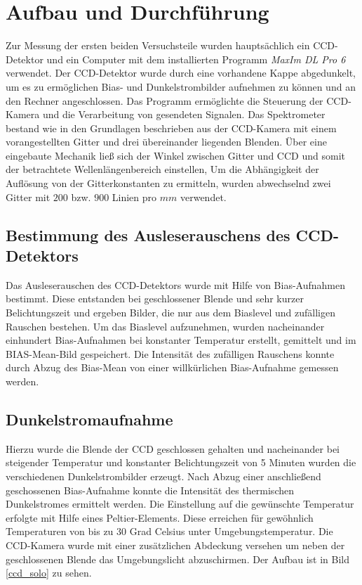 \section{Aufbau und Durchführung} %
\label{sec:aufbau_und_durchf_hrung}

	Zur Messung der ersten beiden Versuchsteile wurden hauptsächlich ein CCD-Detektor und ein Computer mit dem installierten Programm \textit{MaxIm DL Pro 6} verwendet.
	Der CCD-Detektor wurde durch eine vorhandene Kappe abgedunkelt, um es zu ermöglichen Bias- und Dunkelstrombilder aufnehmen zu können und an den Rechner angeschlossen.
	Das Programm ermöglichte die Steuerung der CCD-Kamera und die Verarbeitung von gesendeten Signalen.
	Das Spektrometer bestand wie in den Grundlagen beschrieben aus der CCD-Kamera mit einem vorangestellten Gitter und drei übereinander liegenden Blenden.
	Über eine eingebaute Mechanik ließ sich der Winkel zwischen Gitter und CCD und somit der betrachtete Wellenlängenbereich einstellen,
	Um die Abhängigkeit der Auflösung von der Gitterkonstanten zu ermitteln, wurden abwechselnd zwei Gitter mit $200$ bzw. $900$ Linien pro $\unit{mm}$ verwendet.

	\subsection{Bestimmung des Ausleserauschens des CCD-Detektors} %
	\label{sub:bestimmung_des_ausleserauschens_des_ccd_detektors}
	
		Das Ausleserauschen des CCD-Detektors wurde mit Hilfe von Bias-Aufnahmen bestimmt.
		Diese entstanden bei geschlossener Blende und sehr kurzer Belichtungszeit und ergeben Bilder, die nur aus dem Biaslevel und zufälligen Rauschen bestehen.
		Um das Biaslevel aufzunehmen, wurden nacheinander einhundert Bias-Aufnahmen bei konstanter Temperatur erstellt, gemittelt und im BIAS-Mean-Bild gespeichert. 
		Die Intensität des zufälligen Rauschens konnte durch Abzug des Bias-Mean von einer willkürlichen Bias-Aufnahme gemessen werden.



	\subsection{Dunkelstromaufnahme} %
	\label{sub:dunkelstromaufnahme}

		Hierzu wurde die Blende der CCD geschlossen gehalten und nacheinander bei steigender Temperatur und konstanter Belichtungszeit von 5 Minuten wurden die verschiedenen Dunkelstrombilder erzeugt. 
		Nach Abzug einer anschließend geschossenen Bias-Aufnahme konnte die Intensität des thermischen Dunkelstromes ermittelt werden.
		Die Einstellung auf die gewünschte Temperatur erfolgte mit Hilfe eines Peltier-Elements.
		Diese erreichen für gewöhnlich Temperaturen von bis zu 30 Grad Celsius unter Umgebungstemperatur.
		Die CCD-Kamera wurde mit einer zusätzlichen Abdeckung versehen um neben der geschlossenen Blende das Umgebungslicht abzuschirmen.
		Der Aufbau ist in Bild \ref{ccd_solo} zu sehen.



